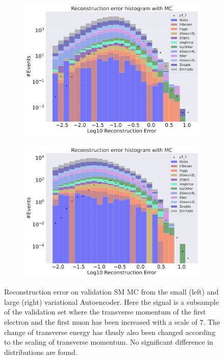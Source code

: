 \begin{figure}[h!]
    \centering
    \begin{subfigure}{.45\textwidth}
        \includegraphics[width=\textwidth]{Figures/VAE_testing/small/b_data_recon_big_rm3_feats_sig_pT_7.pdf}
        \caption{}
        \label{fig:VAE_small_pt_7}
    \end{subfigure}
    \hfill 
    \begin{subfigure}{.45\textwidth}
        \includegraphics[width=\textwidth]{Figures/VAE_testing/big/b_data_recon_big_rm3_feats_sig_pT_7.pdf}
        \caption{ }
        \label{fig:VAE_big_pt_7}
    \end{subfigure}
    \hfill 
    \caption[VAE | Reconstruction error $p_T$ altering of 7]{Reconstruction error on validation SM MC from the small (left) and large (right) variational Autoencoder. Here the signal is a subsample of the validation 
    set where the transverse momentum of the first electron and the first muon has been increased with a scale of $7$. The change of transverse 
    energy has thusly also been changed according to the scaling of transverse momentum. No significant difference in distributions are found.  }
    \label{fig:VAE_big_small_pt_7}
\end{figure}


